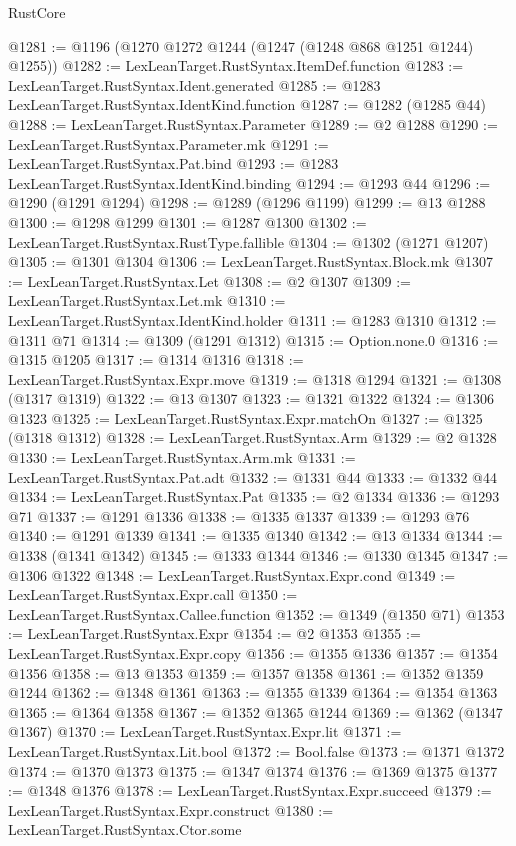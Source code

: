 \begin{lexlean}{RustCore}
\begin{coremodule}
@1281 := @1196 (@1270 @1272 @1244 (@1247 (@1248 @868 @1251 @1244) @1255))
@1282 := LexLeanTarget.RustSyntax.ItemDef.function
@1283 := LexLeanTarget.RustSyntax.Ident.generated
@1285 := @1283 LexLeanTarget.RustSyntax.IdentKind.function
@1287 := @1282 (@1285 @44)
@1288 := LexLeanTarget.RustSyntax.Parameter
@1289 := @2 @1288
@1290 := LexLeanTarget.RustSyntax.Parameter.mk
@1291 := LexLeanTarget.RustSyntax.Pat.bind
@1293 := @1283 LexLeanTarget.RustSyntax.IdentKind.binding
@1294 := @1293 @44
@1296 := @1290 (@1291 @1294)
@1298 := @1289 (@1296 @1199)
@1299 := @13 @1288
@1300 := @1298 @1299
@1301 := @1287 @1300
@1302 := LexLeanTarget.RustSyntax.RustType.fallible
@1304 := @1302 (@1271 @1207)
@1305 := @1301 @1304
@1306 := LexLeanTarget.RustSyntax.Block.mk
@1307 := LexLeanTarget.RustSyntax.Let
@1308 := @2 @1307
@1309 := LexLeanTarget.RustSyntax.Let.mk
@1310 := LexLeanTarget.RustSyntax.IdentKind.holder
@1311 := @1283 @1310
@1312 := @1311 @71
@1314 := @1309 (@1291 @1312)
@1315 := Option.none.{0}
@1316 := @1315 @1205
@1317 := @1314 @1316
@1318 := LexLeanTarget.RustSyntax.Expr.move
@1319 := @1318 @1294
@1321 := @1308 (@1317 @1319)
@1322 := @13 @1307
@1323 := @1321 @1322
@1324 := @1306 @1323
@1325 := LexLeanTarget.RustSyntax.Expr.matchOn
@1327 := @1325 (@1318 @1312)
@1328 := LexLeanTarget.RustSyntax.Arm
@1329 := @2 @1328
@1330 := LexLeanTarget.RustSyntax.Arm.mk
@1331 := LexLeanTarget.RustSyntax.Pat.adt
@1332 := @1331 @44
@1333 := @1332 @44
@1334 := LexLeanTarget.RustSyntax.Pat
@1335 := @2 @1334
@1336 := @1293 @71
@1337 := @1291 @1336
@1338 := @1335 @1337
@1339 := @1293 @76
@1340 := @1291 @1339
@1341 := @1335 @1340
@1342 := @13 @1334
@1344 := @1338 (@1341 @1342)
@1345 := @1333 @1344
@1346 := @1330 @1345
@1347 := @1306 @1322
@1348 := LexLeanTarget.RustSyntax.Expr.cond
@1349 := LexLeanTarget.RustSyntax.Expr.call
@1350 := LexLeanTarget.RustSyntax.Callee.function
@1352 := @1349 (@1350 @71)
@1353 := LexLeanTarget.RustSyntax.Expr
@1354 := @2 @1353
@1355 := LexLeanTarget.RustSyntax.Expr.copy
@1356 := @1355 @1336
@1357 := @1354 @1356
@1358 := @13 @1353
@1359 := @1357 @1358
@1361 := @1352 @1359 @1244
@1362 := @1348 @1361
@1363 := @1355 @1339
@1364 := @1354 @1363
@1365 := @1364 @1358
@1367 := @1352 @1365 @1244
@1369 := @1362 (@1347 @1367)
@1370 := LexLeanTarget.RustSyntax.Expr.lit
@1371 := LexLeanTarget.RustSyntax.Lit.bool
@1372 := Bool.false
@1373 := @1371 @1372
@1374 := @1370 @1373
@1375 := @1347 @1374
@1376 := @1369 @1375
@1377 := @1348 @1376
@1378 := LexLeanTarget.RustSyntax.Expr.succeed
@1379 := LexLeanTarget.RustSyntax.Expr.construct
@1380 := LexLeanTarget.RustSyntax.Ctor.some

\end{coremodule}
\end{lexlean}
